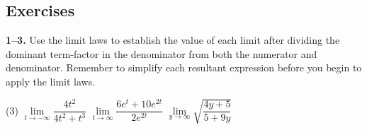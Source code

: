 \documentclass[10pt,oneside,]{book}
\theoremstyle{plain}
\theoremstyle{definition}
\numberwithin{equation}{section}
\begin{document}
\subsection[Exercises]{Exercises}\label{exercises-10}
\textbf{1--3. }\hypertarget{exercisegroup-21}{\null}Use the limit laws to establish the value of each limit after dividing the dominant term-factor in the denominator from both the numerator and denominator. Remember to simplify each resultant expression before you begin to apply the limit laws.%
\par
\begin{exercisegroup}(3)
\exercise[1.]\hypertarget{exercise-86}{\null}\(\lim\limits_{t\to-\infty}\dfrac{4t^2}{4t^2+t^3}\)%
\exercise[2.]\hypertarget{exercise-87}{\null}\(\lim\limits_{t\to\infty}\dfrac{6e^t+10e^{2t}}{2e^{2t}}\)%
\exercise[3.]\hypertarget{exercise-88}{\null}\(\lim\limits_{y\to\infty}\sqrt{\dfrac{4y+5}{5+9y}}\)%
\end{exercisegroup}
\par\smallskip\noindent
\typeout{************************************************}
\typeout{************************************************}
\end{document}
